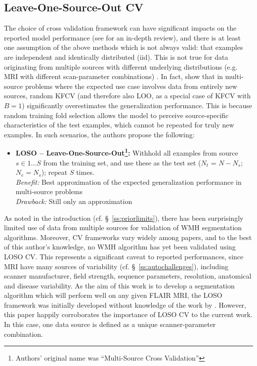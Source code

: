 \subsection{Leave-One-Source-Out CV}
The choice of cross validation framework can have significant impacts on the reported model performance (see \cite{Arlot2010} for an in-depth review), and there is at least one assumption of the above methods which is not always valid: that examples are independent and identically distributed (iid).
This is not true for data originating from multiple sources with different underlying distributions (e.g. MRI with different scan-parameter combinations) \cite{Geras2013}.
In fact, \citeauthor{Geras2013} show that in multi-source problems where the expected use case involves data from entirely new sources, random KFCV (and therefore also LOO, as a special case of KFCV with $B=1$) significantly overestimates the generalization performance.
This is because random training fold selection allows the model to perceive source-specific characteristics of the test examples, which cannot be repeated for truly new examples.
In such scenarios, the authors propose the following:
\begin{itemize}
  \item \textbf{LOSO -- Leave-One-Source-Out\footnote{Authors' original name was ``Multi-Source Cross Validation''}:} Withhold all examples from source $s\in 1\dots S$ from the training set, and use these as the test set ($N_t$ = $N-N_s$; $N_e = N_s$); repeat $S$ times.
  \\\textit{Benefit:} Best approximation of the expected generalization performance in multi-source problems
  \\\textit{Drawback:} Still only an approximation
\end{itemize}
As noted in the introduction (cf. \S\ \ref{ss:priorlimits}), there has been surprisingly limited use of data from multiple sources for validation of WMH segmentation algorithms.
Moreover, CV frameworks vary widely among papers, and to the best of this author's knowledge, no WMH algorithm has yet been validated using LOSO CV.
This represents a significant caveat to reported performances, since MRI have many sources of variability (cf. \S\ \ref{ss:autochallenges}), including scanner manufacturer, field strength, sequence parameters, resolution, anatomical and disease variability.
As the aim of this work is to develop a segmentation algorithm which will perform well on any given FLAIR MRI, the LOSO framework was initially developed without knowledge of the work by \citeauthor{Geras2013}.
However, this paper happily corroborates the importance of LOSO CV to the current work.
In this case, one data source is defined as a unique scanner-parameter combination.
